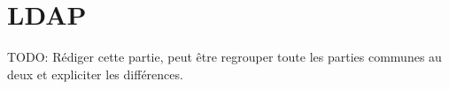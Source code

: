 
\section{LDAP}
TODO: Rédiger cette partie, peut être regrouper toute les parties communes au deux et expliciter les différences.